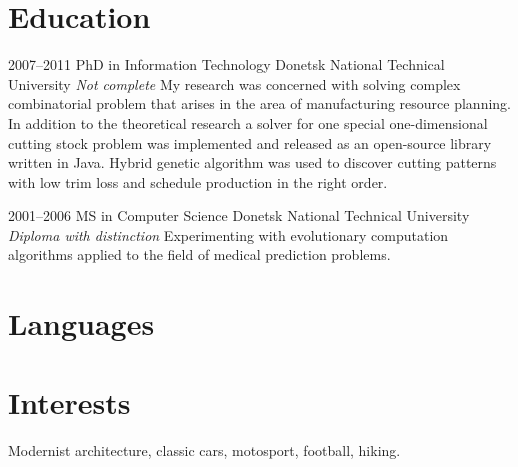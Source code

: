 \medskip
\section{Education}

\cventry
    {2007--2011}
    {PhD in Information Technology}
    {Donetsk National Technical University}
    {}
    {\newline\textit{Not complete}}
    {My research was concerned with solving complex combinatorial problem that
    arises in the area of manufacturing resource planning. In addition to the
    theoretical research a solver for one special one-dimensional cutting stock
    problem was implemented and released as an open-source library written in
    Java. Hybrid genetic algorithm was used to discover cutting patterns with
    low trim loss and schedule production in the right order.\newline}
    
\cventry
    {2001--2006}
    {MS in Computer Science}
    {Donetsk National Technical University}
    {}
    {\newline\textit{Diploma with distinction}}
    {Experimenting with evolutionary computation algorithms applied to the 
	field of medical prediction problems.}


\medskip
\nocite{*}
\renewcommand{\bibliographyitemlabel}{[\arabic{enumiv}]}

\begin{flushleft}

\end{flushleft}


\medskip
\section{Languages}


\medskip
\section{Interests}

\cvline
    {}{Modernist architecture, classic cars, motosport, football, hiking.}

\setcounter{footnote}{1}
\vfill
\enlargethispage{\footskip}
\footnotetext{\textcolor{color2}{Opening quote belongs to Chet Haase.}}

